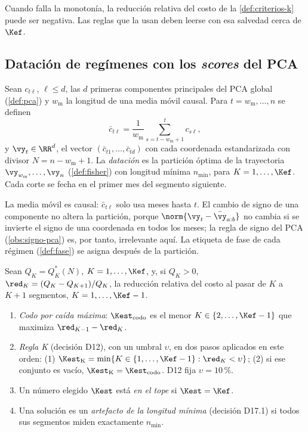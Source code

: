 Cuando falla la monotonía, la reducción relativa del costo de la \cref{def:criterios-k} puede ser
negativa. Las reglas que la usan deben leerse con esa salvedad cerca de $\Kef$.

\subsection{Datación de regímenes con los \emph{scores} del PCA}
\label{sec:datacion}

\begin{definicion}\label{def:datacion}
Sean $c_{t\ell}$, $\ell\le d$, las $d$ primeras componentes principales del PCA global
(\cref{def:pca}) y $w_{\mathrm m}$ la longitud de una media móvil causal. Para
$t=w_{\mathrm m},\dots,n$ se definen
\[
  \bar c_{t\ell}=\frac{1}{w_{\mathrm m}}\sum_{s=t-w_{\mathrm m}+1}^{t}c_{s\ell},
\]
y $\vy_t\in\RR^d$, el vector $(\bar c_{t1},\dots,\bar c_{td})$ con cada coordenada estandarizada con
divisor $N=n-w_{\mathrm m}+1$. La \emph{datación} es la partición óptima de la trayectoria
$\vy_{w_{\mathrm m}},\dots,\vy_n$ (\cref{def:fisher}) con longitud mínima $n_{\min}$, para
$K=1,\dots,\Kef$. Cada corte se fecha en el primer mes del segmento siguiente.
\end{definicion}

La media móvil es causal: $\bar c_{t\ell}$ solo usa meses hasta $t$. El cambio de signo de una
componente no altera la partición, porque $\norm{\vy_t-\bar\vy_{a:b}}$ no cambia si se invierte el
signo de una coordenada en todos los meses; la regla de signo del PCA
(\cref{obs:signo-pca}) es, por tanto, irrelevante aquí. La etiqueta de fase de cada régimen
(\cref{def:fase}) se asigna después de la partición.

\begin{definicion}\label{def:criterios-k}
Sean $Q_K=Q^\ast_K(N)$, $K=1,\dots,\Kef$, y, si $Q_K>0$,
$\red_K=(Q_K-Q_{K+1})/Q_K$, la reducción relativa del costo al pasar de $K$ a $K+1$ segmentos,
$K=1,\dots,\Kef-1$.
\begin{enumerate}[label=(\alph*)]
  \item \emph{Codo por caída máxima}: $\Kest_{\mathrm{codo}}$ es el menor
    $K\in\{2,\dots,\Kef-1\}$ que maximiza $\red_{K-1}-\red_K$.
  \item \emph{Regla K} (decisión D12), con un umbral $\upsilon$, en dos pasos aplicados en este
    orden: (1) $\Kest_{\mathrm K}=\min\{K\in\{1,\dots,\Kef-1\}:\red_K<\upsilon\}$; (2) si ese
    conjunto es vacío, $\Kest_{\mathrm K}=\Kest_{\mathrm{codo}}$. D12 fija $\upsilon=10$\,\%.
  \item Un número elegido $\Kest$ está \emph{en el tope} si $\Kest=\Kef$.
  \item Una solución es un \emph{artefacto de la longitud mínima} (decisión D17.1) si todos sus
    segmentos miden exactamente $n_{\min}$.
\end{enumerate}
\end{definicion}

